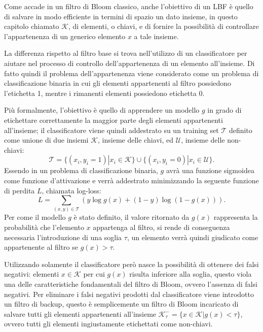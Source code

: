 \documentclass[../../main.tex]{subfiles}
\begin{document}
    Come accade in un filtro di Bloom classico, anche l'obiettivo di un LBF è quello di salvare in modo efficiente in termini di spazio un dato insieme, in questo capitolo chiamato $\mathcal{K}$, di elementi, o chiavi, e di fornire la possibilità di controllare l'appartenenza di un generico elemento $x$ a tale insieme.

    La differenza rispetto al filtro base si trova nell'utilizzo di un classificatore per aiutare nel processo di controllo dell'appartenenza di un elemento all'insieme. Di fatto quindi il problema dell'appartenenza viene considerato come un problema di classificazione binaria in cui gli elementi appartenenti al filtro possiedono l'etichetta 1, mentre i rimanenti elementi possiedono etichetta 0.

    Più formalmente, l'obiettivo è quello di apprendere un modello $g$ in grado di etichettare correttamente la maggior parte degli elementi appartenenti all'insieme; il classificatore viene quindi addestrato su un training set $\mathcal{T}$ definito come unione di due insiemi $\mathcal{K}$, insieme delle chiavi, ed $\mathcal{U}$, insieme delle non-chiavi:
    \begin{equation}
        \mathcal{T} = \{(x_i, y_i = 1) | x_i \in \mathcal{K}\} \cup \{(x_i, y_i = 0) | x_i \in \mathcal{U}\}.
    \end{equation}
    Essendo in un problema di classificazione binaria, $g$ avrà una funzione sigmoidea come funzione d'attivazione e verrà addestrato minimizzando la seguente funzione di perdita $L$, chiamata log-loss:
    \begin{equation}
        L = \sum_{(x,y) \in \mathcal{T}}\left(y \log g(x) + (1 - y) \log(1 - g(x))\right).
        \label{eqn:logloss}
    \end{equation}
    Per come il modello $g$ è stato definito, il valore ritornato da $g(x)$ rappresenta la probabilità che l'elemento $x$ appartenga al filtro, si rende di conseguenza necessaria l'introduzione di una soglia $\tau$, un elemento verrà quindi giudicato come appartenente al filtro se $g(x) > \tau$.
    
    Utilizzando solamente il classificatore però nasce la possibilità di ottenere dei falsi negativi: elementi $x \in \mathcal{K}$ per cui $g(x)$ risulta inferiore alla soglia, questo viola una delle caratteristiche fondamentali del filtro di Bloom, ovvero l'assenza di falsi negativi. Per eliminare i falsi negativi prodotti dal classificatore viene introdotto un filtro di backup, questo è semplicemente un filtro di Bloom incaricato di salvare tutti gli elementi appartenenti all'insieme $\mathcal{K}_{\tau}^- = \{x \in \mathcal{K} | g(x) < \tau\}$, ovvero tutti gli elementi ingiustamente etichettati come non-chiavi.
\end{document}
